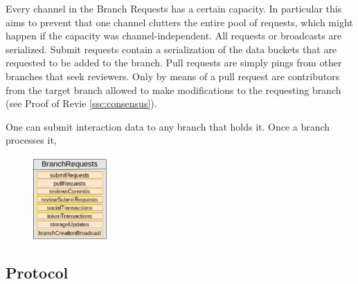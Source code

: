 \documentclass[14pt]{article}
\begin{document}
Every channel in the Branch Requests has a certain capacity. In particular this aims to prevent that one channel clutters the entire pool of requests, which might happen if the capacity was channel-independent. All requests or broadcasts are serialized. 
Submit requests contain a serialization of the data buckets that are requested to be added to the branch. Pull requests are simply pings from other branches that seek reviewers. Only by means of a pull request are contributors from the target branch allowed to make modifications to the requesting branch (see Proof of Revie \ref{ssc:consensus}).


One can submit interaction data to any branch that holds it. Once a branch processes it, 



\begin{figure}[h!]
  \begin{center}
    \includegraphics[width=0.25\textwidth]{img/MempoolV3.png}
\end{center}
 \caption{}
 \label{fig:mempool}
\end{figure}



\subsection{Protocol}
\label{ssc:protocol}
\end{document}
